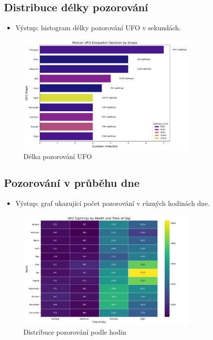 \documentclass[a4paper,12pt]{article}
\begin{document}
\subsection{Distribuce délky pozorování}
\begin{itemize}
    \item Výstup: histogram délky pozorování UFO v sekundách.
\end{itemize}

\begin{figure}[h]
\centering
\includegraphics[width=0.8\textwidth]{../images/ufo_encounter_duration.png}
\caption{Délka pozorování UFO}
\end{figure}

\subsection{Pozorování v průběhu dne}
\begin{itemize}
    \item Výstup: graf ukazující počet pozorování v různých hodinách dne.
\end{itemize}

\begin{figure}[h]
\centering
\includegraphics[width=0.8\textwidth]{../images/ufo_sightings_by_time.png}
\caption{Distribuce pozorování podle hodin}
\end{figure}
\end{document}
